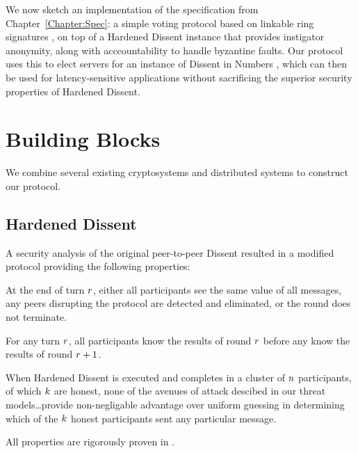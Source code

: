 We now sketch an implementation of the specification from
Chapter~\ref{Chapter:Spec}: a simple voting protocol based on linkable ring
signatures \cite{lrs}, on top of a Hardened Dissent \cite{sec} instance that
provides instigator anonymity, along with acccountability to handle byzantine
faults. Our protocol uses this to elect servers for an instance of Dissent in
Numbers \cite{din}, which can then be used for latency-sensitive applications
without sacrificing the superior security properties of Hardened Dissent.
\section{Building Blocks}
We combine several existing cryptosystems and distributed systems to construct
our protocol.
\subsection{Hardened Dissent}
A security analysis of the original peer-to-peer Dissent resulted in a modified
protocol providing the following properties:
  \begin{theorem} At the end of turn $r$, either all participants see the
    same value of all messages, any peers disrupting the protocol are detected
    and eliminated, or the round does not terminate.%
  \end{theorem}
  \begin{theorem} For any turn $r$, all participants know the results of
    round $r$ before any know the results of round
    $r+1$.\end{theorem}\label{theorem:rounds}
  \begin{theorem}[Anonymity] When Hardened Dissent is executed and completes in
    a cluster of $n$ participants, of which $k$ are honest,
    none of the avenues of attack descibed in our threat models\ldots provide
    non-negligable advantage over uniform guessing in determining which of the
    $k$ honest participants sent any particular message.
  \end{theorem}\label{theorem:anon}
  All properties are rigorously proven in \cite{sec}.

